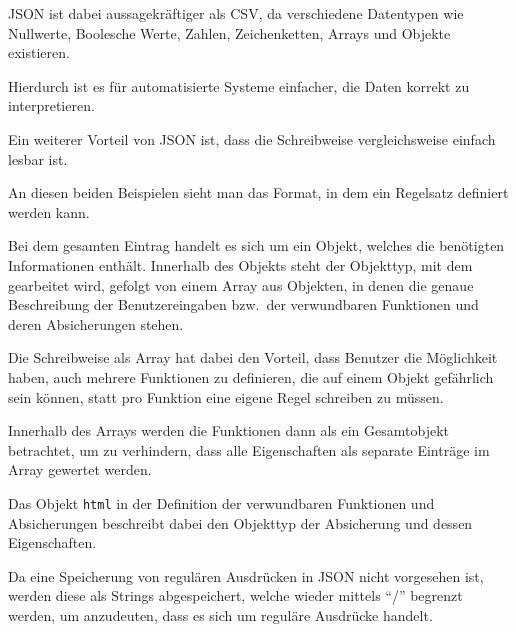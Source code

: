                 \gls{JSON} ist dabei aussagekräftiger als
                \gls{CSV},
                da verschiedene Datentypen wie Nullwerte,
                Boolesche Werte,
                Zahlen,
                Zeichenketten,
                Arrays und
                Objekte existieren.\cite{Bray2017}

                Hierdurch ist es für automatisierte Systeme einfacher,
                die Daten korrekt zu interpretieren.

                Ein weiterer Vorteil von
                \gls{JSON} ist,
                dass die Schreibweise vergleichsweise einfach lesbar ist.

                

                

                An diesen beiden Beispielen sieht man das Format,
                in dem ein Regelsatz definiert werden kann.

                Bei dem gesamten Eintrag handelt es sich um ein Objekt,
                welches die benötigten Informationen enthält.
                Innerhalb des Objekts steht der Objekttyp,
                mit dem gearbeitet wird,
                gefolgt von einem Array aus Objekten,
                in denen die genaue Beschreibung der Benutzereingaben bzw.\ der verwundbaren Funktionen und
                deren Absicherungen stehen.

                Die Schreibweise als Array hat dabei den Vorteil,
                dass Benutzer die Möglichkeit haben,
                auch mehrere Funktionen zu definieren,
                die auf einem Objekt gefährlich sein können,
                statt pro Funktion eine eigene Regel schreiben zu müssen.

                Innerhalb des Arrays werden die Funktionen dann als ein Gesamtobjekt betrachtet,
                um zu verhindern,
                dass alle Eigenschaften als separate Einträge im Array gewertet werden.

                Das Objekt
                \lstinline{html} in der Definition der verwundbaren Funktionen und
                Absicherungen beschreibt dabei den Objekttyp der Absicherung und
                dessen Eigenschaften.

                Da eine Speicherung von regulären Ausdrücken in
                \gls{JSON} nicht vorgesehen ist,
                werden diese als Strings abgespeichert,
                welche wieder mittels
                \enquote{/} begrenzt werden,
                um anzudeuten,
                dass es sich um reguläre Ausdrücke handelt.

